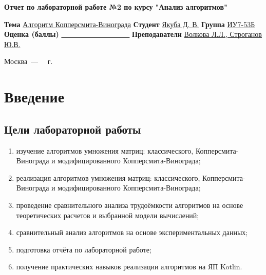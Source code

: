 \documentclass[12pt]{report}
\begin{document}
\begin{titlepage}
	
	\begin{center}
		\Large\textbf{Отчет по лабораторной работе №2 по курсу "Анализ алгоритмов"}\newline
	\end{center}
	
	\noindent\textbf{Тема} \underline{Алгоритм Копперсмита-Винограда}\newline\newline\newline
	\noindent\textbf{Студент} \underline{Якуба Д. В.}\newline\newline
	\noindent\textbf{Группа} \underline{ИУ7-53Б}\newline\newline
	\noindent\textbf{Оценка (баллы)} \underline{~~~~~~~~~~~~~~~~~~~}\newline\newline
	\noindent\textbf{Преподаватели} \underline{Волкова Л.Л., Строганов Ю.В.}\newline
	
	\begin{center}
		\vfill
		Москва~---~\the\year
		~г.
	\end{center}
\end{titlepage}

\tableofcontents

\newpage
\chapter*{Введение}
\section*{Цели лабораторной работы}
\begin{enumerate}
\item изучение алгоритмов умножения матриц: классического, Копперсмита-Винограда и модифицированного Копперсмита-Винограда;
\item реализация алгоритмов умножения матриц: классического, Копперсмита-Винограда и модифицированного Копперсмита-Винограда;
\item проведение сравнительного анализа трудоёмкости алгоритмов на основе теоретических расчетов и выбранной модели вычислений;
\item сравнительный анализ алгоритмов на основе экспериментальных данных;
\item подготовка отчёта по лабораторной работе;
\item получение практических навыков реализации алгоритмов на ЯП Kotlin.
\end{enumerate}
\end{document}
